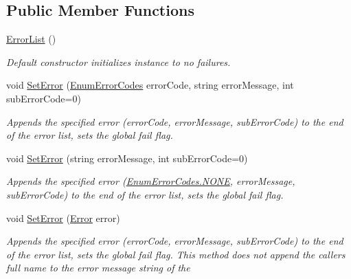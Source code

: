 \subsection*{Public Member Functions}
\begin{DoxyCompactItemize}
\item 
\mbox{\hyperlink{class_c_s_i_1_1_library_1_1_errors_1_1_error_list_a094dd0de977fd1f809671e10788df805}{Error\+List}} ()
\begin{DoxyCompactList}\small\item\em Default constructor initializes instance to no failures. \end{DoxyCompactList}\item 
void \mbox{\hyperlink{class_c_s_i_1_1_library_1_1_errors_1_1_error_list_a33937a090601082f29f922c708b177a7}{Set\+Error}} (\mbox{\hyperlink{namespace_c_s_i_1_1_library_1_1_errors_a5534735de1ef2256eb4c52c7440e30d7}{Enum\+Error\+Codes}} error\+Code, string error\+Message, int sub\+Error\+Code=0)
\begin{DoxyCompactList}\small\item\em Appends the specified error (error\+Code, error\+Message, sub\+Error\+Code) to the end of the error list, sets the global fail flag. \end{DoxyCompactList}\item 
void \mbox{\hyperlink{class_c_s_i_1_1_library_1_1_errors_1_1_error_list_a7cd778a4248c015880bfcdbdba66e91f}{Set\+Error}} (string error\+Message, int sub\+Error\+Code=0)
\begin{DoxyCompactList}\small\item\em Appends the specified error (\mbox{\hyperlink{namespace_c_s_i_1_1_library_1_1_errors_a5534735de1ef2256eb4c52c7440e30d7ab50339a10e1de285ac99d4c3990b8693}{Enum\+Error\+Codes.\+N\+O\+NE}}, error\+Message, sub\+Error\+Code) to the end of the error list, sets the global fail flag. \end{DoxyCompactList}\item 
void \mbox{\hyperlink{class_c_s_i_1_1_library_1_1_errors_1_1_error_list_af906fa9d544734005f9cbe01485d5e5f}{Set\+Error}} (\mbox{\hyperlink{class_c_s_i_1_1_library_1_1_errors_1_1_error}{Error}} error)
\begin{DoxyCompactList}\small\item\em Appends the specified error (error\+Code, error\+Message, sub\+Error\+Code) to the end of the error list, sets the global fail flag. This method does not append the caller\textquotesingle{}s full name to the error message string of the \end{DoxyCompactList}\item 

\end{DoxyCompactItemize}
